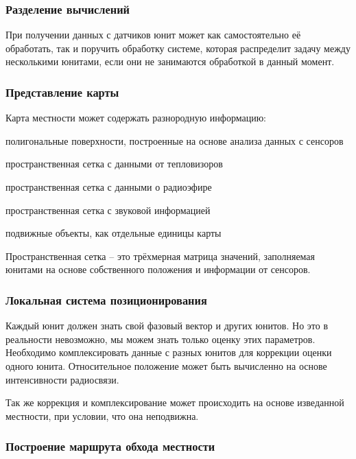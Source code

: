 \subsubsection{Разделение вычислений}

При получении данных с датчиков юнит может как самостоятельно
её обработать, так и поручить обработку системе, которая
распределит задачу между несколькими юнитами, если они не
занимаются обработкой в данный момент.

\subsubsection{Представление карты}

Карта местности может содержать разнородную информацию:
\begin{mintemize}
    \item полигональные поверхности, построенные на основе анализа
        данных с сенсоров
    \item пространственная сетка с данными от тепловизоров
    \item пространственная сетка с данными о радиоэфире
    \item пространственная сетка с звуковой информацией
    \item подвижные объекты, как отдельные единицы карты
\end{mintemize}

Пространственная сетка -- это трёхмерная матрица значений, заполняемая
юнитами на основе собственного положения и информации от сенсоров.

\subsubsection{Локальная система позиционирования}

Каждый юнит должен знать свой фазовый вектор и других юнитов.
Но это в реальности невозможно, мы можем знать только
оценку этих параметров. Необходимо комплексировать данные с разных
юнитов для коррекции оценки одного юнита. Относительное положение
может быть вычисленно на основе интенсивности радиосвязи.

Так же коррекция и комплексирование может происходить на основе
изведанной местности, при условии, что она неподвижна.

\subsubsection{Построение маршрута обхода местности}

